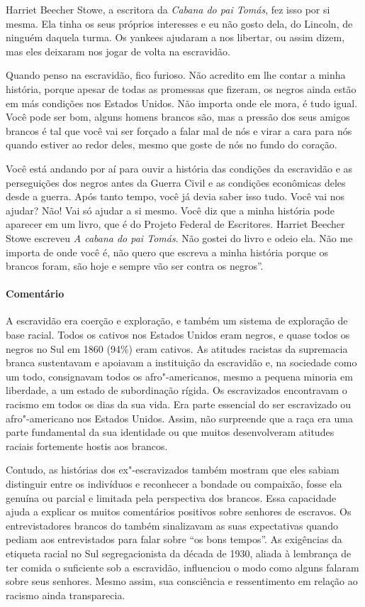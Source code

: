 Harriet Beecher Stowe, a escritora da \emph{Cabana do pai Tomás}, fez
isso por si mesma. Ela tinha os seus próprios interesses e eu não gosto
dela, do Lincoln, de ninguém daquela turma. Os yankees ajudaram a nos
libertar, ou assim dizem, mas eles deixaram nos jogar de volta na
escravidão.

Quando penso na escravidão, fico furioso. Não acredito em lhe contar a
minha história, porque apesar de todas as promessas que fizeram, os
negros ainda estão em más condições nos Estados Unidos. Não importa onde
ele mora, é tudo igual. Você pode ser bom, alguns homens brancos são,
mas a pressão dos seus amigos brancos é tal que você vai ser forçado a
falar mal de nós e virar a cara para nós quando estiver ao redor deles,
mesmo que goste de nós no fundo do coração.

Você está andando por aí para ouvir a história das condições da
escravidão e as perseguições dos negros antes da Guerra Civil e as
condições econômicas deles desde a guerra. Após tanto tempo, você já
devia saber isso tudo. Você vai nos ajudar? Não! Vai só ajudar a si
mesmo. Você diz que a minha história pode aparecer em um livro, que é do
Projeto Federal de Escritores. Harriet Beecher Stowe escreveu \emph{A
cabana do pai Tomás}. Não gostei do livro e odeio ela. Não me importa de
onde você é, não quero que escreva a minha história porque os brancos
foram, são hoje e sempre vão ser contra os negros''.

\paragraph{Comentário}\quad
{\small
A escravidão era coerção e exploração, e também um sistema de
exploração de base racial. Todos os cativos nos Estados Unidos eram
negros, e quase todos os negros no Sul em 1860 (94\%) eram cativos. As
atitudes racistas da supremacia branca sustentavam e apoiavam a
instituição da escravidão e, na sociedade como um todo, consignavam
todos os afro"-americanos, mesmo a pequena minoria em liberdade, a um
estado de subordinação rígida. Os escravizados encontravam o racismo em
todos os dias da sua vida. Era parte essencial do ser escravizado ou
afro"-americano nos Estados Unidos. Assim, não surpreende que a raça era
uma parte fundamental da sua identidade ou que muitos desenvolveram
atitudes raciais fortemente hostis aos brancos.

Contudo, as histórias dos ex"-escravizados também mostram que eles
sabiam distinguir entre os indivíduos e reconhecer a bondade ou
compaixão, fosse ela genuína ou parcial e limitada pela perspectiva dos
brancos. Essa capacidade ajuda a explicar os muitos comentários
positivos sobre senhores de escravos. Os entrevistadores brancos do 
também sinalizavam as suas expectativas quando pediam aos entrevistados
para falar sobre ``os bons tempos''. As exigências da etiqueta racial no
Sul segregacionista da década de 1930, aliada à lembrança de ter comida
o suficiente sob a escravidão, influenciou o modo como alguns
falaram sobre seus senhores. Mesmo assim, sua consciência e
ressentimento em relação ao racismo ainda transparecia.
}

